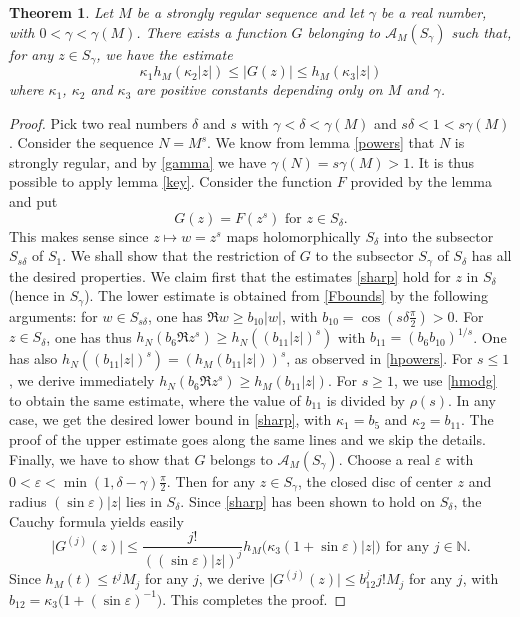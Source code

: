 \documentclass[a4paper]{amsart}
\theoremstyle{plain}
\newtheorem{thm}[subsubsection]{Theorem}
\theoremstyle{definition}
\theoremstyle{remark}
\begin{document}
\begin{thm}\label{sectflat} 
Let $ M $ be a strongly regular sequence and let $ \gamma $ be a real number, with
$ 0<\gamma<\gamma(M) $. There exists a function $ G $ belonging to
$ \mathcal{A}_M(S_\gamma) $ such that, for any $ z\in S_\gamma $, we have the estimate
\begin{equation}\label{sharp}
\kappa_1h_M(\kappa_2\vert z\vert)\leq \vert G(z)\vert\leq h_M(\kappa_3\vert z\vert)
\end{equation}
where
$ \kappa_1 $, $ \kappa_2 $ and $ \kappa_3 $ are positive constants depending
only on $ M $ and $ \gamma $.
\end{thm}
\begin{proof}
Pick two real numbers $ \delta $ and $ s $ with $ \gamma<\delta<\gamma(M) $ and
$ s\delta<1<s\gamma(M) $. Consider
the sequence $ N=M^s $. We know from lemma \ref{powers} that $ N $ is strongly
regular, and by \eqref{gamma} we have $ \gamma(N)=s\gamma(M)>1 $. It is
thus possible to apply lemma \ref{key}. Consider the function $ F $ provided by
the lemma and put
\begin{equation*}
G(z)=F(z^s)\text{ for }z\in S_\delta.
\end{equation*}
This makes sense since $ z\longmapsto w=z^s $ maps holomorphically 
$ S_\delta $ into the subsector $ S_{s\delta} $ of $ S_1 $. We shall show that the restriction of $ G $ to the
subsector $ S_\gamma $ of $ S_\delta $ has all the desired properties. We claim first that the
estimates \eqref{sharp} hold for $ z $ in $ S_\delta $ (hence in
$ S_\gamma $). The lower estimate is obtained from \eqref{Fbounds} by the following arguments: for $ w\in S_{s\delta} $, one has 
$ \Re w\geq b_{10}\vert w\vert $, with $ b_{10}=\cos(s\delta\frac{\pi}{2})>0 $. For
$ z\in S_\delta $, one has thus $ h_N(b_6\Re z^s)\geq h_N((b_{11}\vert z\vert)^s) $ with $ b_{11}=(b_6b_{10})^{1/s} $. One has also
$ h_N((b_{11}\vert z\vert)^s)=
(h_M(b_{11}\vert z\vert))^s $, as observed in \eqref{hpowers}. For $ s\leq 1 $, we
derive immediately $ h_N(b_6\Re z^s)\geq h_M(b_{11}\vert z\vert) $. For $ s\geq 1 $, we
use \eqref{hmodg} to obtain the same estimate, where the value of $ b_{11} $ is
divided by $ \rho(s) $. In any case, we get the desired lower bound in \eqref{sharp}, with
$ \kappa_1=b_5 $ and $ \kappa_2=b_{11} $. The proof of the upper estimate goes along the same lines and we
skip the details. Finally, we have to show that $ G $ belongs to
$ \mathcal{A}_M(S_\gamma) $. Choose a real $ \varepsilon $ with
$ 0<\varepsilon<\min(1,\delta-\gamma)\frac{\pi}{2} $. Then for any
$ z\in S_\gamma $, the closed disc of center $ z $ and radius
$ (\sin\varepsilon)\vert z\vert $ lies in $ S_\delta $. Since \eqref{sharp} has been shown to hold on $ S_\delta $, the Cauchy formula yields easily
\begin{equation}\label{cauchy1}
\vert G^{(j)}(z)\vert\leq \frac{j!}{((\sin\varepsilon)\vert z\vert)^j}
h_M\big(\kappa_3(1+\sin\varepsilon)\vert z\vert\big)\text{ for any }j\in\mathbb{N}.
\end{equation}
Since $ h_M(t)\leq t^j M_j $ for any $ j $, we derive
$ \vert G^{(j)}(z)\vert\leq b_{12}^j j!M_j $ for any $ j $, with
$ b_{12}=\kappa_3\big(1+(\sin\varepsilon)^{-1}\big) $. This completes the proof.
\end{proof}
\end{document}
